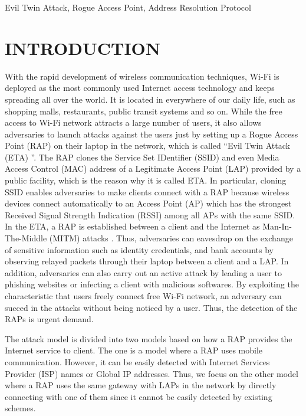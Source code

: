 \documentclass[conference]{IEEEtran}
\begin{document}
\begin{IEEEkeywords}
Evil Twin Attack, Rogue Access Point, Address Resolution Protocol
\end{IEEEkeywords}

\section{INTRODUCTION}
With the rapid development of wireless communication techniques, Wi-Fi is deployed as the most commonly used Internet access technology and keeps spreading all over the world\cite{bg-evi}.
It is located in everywhere of our daily life, such as shopping malls, restaurants, public transit systems and so on.
While the free access to Wi-Fi network attracts a large number of users, it also allows adversaries to launch attacks against the users just by setting up a Rogue Access Point (RAP) on their laptop in the network, which is called ``Evil Twin Attack (ETA) ''\cite{laptop-evi}.
The RAP clones the Service Set IDentifier (SSID) and even Media Access Control (MAC) address of a Legitimate Access Point (LAP) provided by a public facility, which is the reason why it is called ETA.
In particular, cloning SSID enables adversaries to make clients connect with a RAP because wireless devices connect automatically to an Access Point (AP) which has the strongest Received Signal Strength Indication (RSSI) among all APs with the same SSID.
In the ETA, a RAP is established between a client and the Internet as Man-In-The-Middle (MITM) attacks \cite{spoof-evi}.
Thus, adversaries can eavesdrop on the exchange of sensitive information such as identity credentials, and bank accounts by observing relayed packets through their laptop between a client and a LAP.
In addition, adversaries can also carry out an active attack by leading a user to phishing websites or infecting a client with malicious softwares\cite{research}.
By exploiting the characteristic that users freely connect free Wi-Fi network,  an adversary can succed in the attacks without being noticed by a user.
Thus, the detection of the RAPs is urgent demand.

The attack model is divided into two models based on how a RAP provides the Internet service to client.
The one is a model where a RAP uses mobile communication.
However, it can be easily detected with Internet Services Provider (ISP) names or Global IP addresses\cite{rtt}.
Thus, we focus on the other model where a RAP uses the same gateway with LAPs in the network by directly connecting with one of them since it cannot be easily detected by existing schemes.
\end{document}
